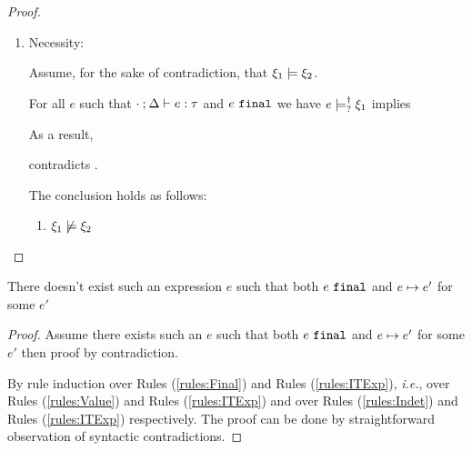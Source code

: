\begin{proof}
\begin{enumerate}
\item Necessity:
  Assume, for the sake of contradiction, that $\xi_1 \models \xi_2$.
  For all $e$ such that $\cdot \mathbin{;} \Delta \vdash e : \tau$ and $e ~\mathtt{final}$ we have $e \models_{?}^{\dag} \xi_1$ implies
  As a result,
   contradicts .

  The conclusion holds as follows:
  \begin{enumerate}
    \item $\xi_1 \not\models \xi_2$
  \end{enumerate}
\end{enumerate}
\resetpfcounter
\end{proof}

\begin{lem}[Finality]
  \label{lem:finality}
  There doesn't exist such an expression $e$ such that both $e ~\mathtt{final}$ and $e \mapsto e'$ for some $e'$
\end{lem}
\begin{proof}Assume there exists such an $e$ such that both $e ~\mathtt{final}$ and $e \mapsto e'$ for some $e'$ then proof by contradiction.
 
  By rule induction over Rules (\ref{rules:Final}) and Rules (\ref{rules:ITExp}), \textit{i.e.}, over Rules (\ref{rules:Value}) and Rules (\ref{rules:ITExp}) and over Rules (\ref{rules:Indet}) and Rules (\ref{rules:ITExp}) respectively. The proof can be done by straightforward observation of syntactic contradictions.
\end{proof}

